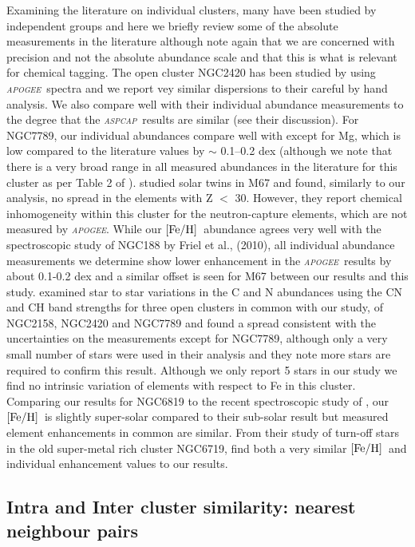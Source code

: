 \documentclass[14pt, preprint2]{aastex6}
\newcommand{\project}[1]{\textsl{#1}}
\newcommand{\apogee}{\project{\textsc{apogee}}}
\newcommand{\aspcap}{\project{\textsc{aspcap}}}
\newcommand{\feh}{\mbox{$\rm [Fe/H]$}}
\begin{document}
Examining the literature on individual clusters, many have been studied by independent groups and here we briefly review some of the absolute measurements in the literature although note again that we are concerned with precision and not the absolute abundance scale and that this is what is relevant for chemical tagging. The open cluster NGC2420 has been studied by \citet{Souto2016} using \apogee\ spectra and we report vey similar dispersions to their careful by hand analysis. We also compare well with their individual abundance measurements to the degree that the \aspcap\ results are similar (see their discussion). For NGC7789,  our individual abundances compare well with \citet{Overbeek2015} except for Mg,  which is low compared to the literature values by $\sim$ 0.1--0.2 dex (although we note that there is a very broad range in all measured abundances in the literature for this cluster as per Table 2 of \citet{Overbeek2015}). \citet{L2016} studied solar twins in M67 and found, similarly to our analysis, no spread in the elements with Z $<$ 30. However, they report chemical inhomogeneity within this cluster for the neutron-capture elements, which are not measured by \apogee. While our \feh\ abundance agrees very well with the spectroscopic study of NGC188 by Friel et al., (2010), all individual abundance measurements we determine show lower enhancement in the \apogee\ results by about 0.1-0.2 dex and a similar offset is seen for M67 between our results and this study. \citet{Car2013} examined star to star variations in the C and N abundances using the CN and CH band strengths for three open clusters in common with our study, of NGC2158, NGC2420 and NGC7789 and found a spread consistent with the uncertainties on the measurements except for NGC7789, although only a very small number of stars were used in their analysis and they note more stars are required to confirm this result. Although we only report 5 stars in our study we find no intrinsic variation of elements with respect to Fe in this cluster.  Comparing our results for NGC6819 to the recent spectroscopic study of \citet{LB2015}, our \feh\ is slightly super-solar compared to their sub-solar result but measured element enhancements in common are similar. From their study of turn-off stars in the old super-metal rich cluster NGC6719, \citet{Bo2015} find both a  very similar \feh\ and individual enhancement values to our results. 


\subsection{Intra and Inter cluster similarity: nearest neighbour pairs}
\end{document}
